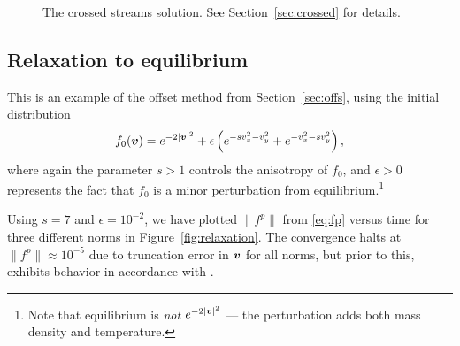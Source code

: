 \begin{figure}
    \centering
    \caption{The crossed streams solution. See Section~\vref{sec:crossed} for details.}
    \label{fig:hc1:sols}
\end{figure}

\subsection{Relaxation to equilibrium} \label{sec:relax}

This is an example of the offset method from Section~\ref{sec:offs}, using the initial distribution
\[
    f_0({\bm v}) = e^{-2|{\bm v}|^2} + \epsilon\left(e^{-sv_x^2-v_y^2} + 
            e^{-v_x^2-sv_y^2}\right),
\]
where again the parameter $s>1$ controls the anisotropy of $f_{0}$, and
$\epsilon>0$ represents the fact that $f_0$ is a minor perturbation from
equilibrium.\footnote{Note that equilibrium is {\em not} $e^{-2|{\bm v}|^2}$ ---
the perturbation adds both mass density and temperature.}

Using $s=7$ and $\epsilon=10^{-2}$, we have plotted $\|f^p\|$ from \eqref{eq:fp}
versus time for three different norms in Figure~\vref{fig:relaxation}. The
convergence halts at $\|f^p\|\approx10^{-5}$ due to truncation error in ${\bm v}$ for
all norms, but prior to this, exhibits behavior in accordance with
\cite{Gressman11}.

